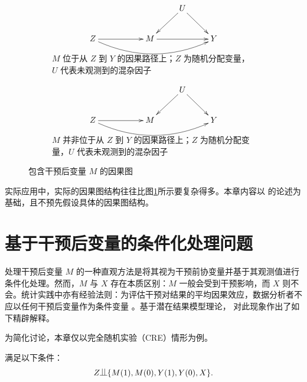  


\begin{figure}[h]
\centering
\begin{subfigure}[]{\textwidth}
                \centering
$$
\begin{xy}
\xymatrix{
&& & U \ar[dl]   \ar[dr] \\
Z \ar[rr] \ar@/_1.5pc/[rrrr] & & M\ar[rr] & & Y\\
}
\end{xy}
$$ 
               \caption{$M$ 位于从 $Z$ 到 $Y$ 的因果路径上；$Z$ 为随机分配变量，$U$ 代表未观测到的混杂因子}
        \end{subfigure}%
        
        \begin{subfigure}[]{\textwidth}
                \centering
$$
\begin{xy}
\xymatrix{
&& & U \ar[dl]   \ar[dr] \\
Z \ar[rr] \ar@/_1.5pc/[rrrr] & & M  & & Y\\
}
\end{xy}
$$
                \caption{$M$ 并非位于从 $Z$ 到 $Y$ 的因果路径上；$Z$ 为随机分配变量，$U$ 代表未观测到的混杂因子}
        \end{subfigure}%
        
\caption{包含干预后变量 $M$ 的因果图}\label{fig::intermediate-diagram}
\end{figure}


实际应用中，实际的因果图结构往往比图\ref{fig::intermediate-diagram}所示要复杂得多。本章内容以 \citet{frangakis2002principal} 的论述为基础，且不预先假设具体的因果图结构。





\section{基于干预后变量的条件化处理问题}

处理干预后变量 $M$ 的一种直观方法是将其视为干预前协变量并基于其观测值进行条件化处理。然而，$M$ 与 $X$ 存在本质区别：$M$ 一般会受到干预影响，而 $X$ 则不会。统计实践中亦有经验法则：为评估干预对结果的平均因果效应，数据分析者不应以任何干预后变量作为条件变量 \citep{cochran1957analysis, rosenbaum1984consquences}。基于潜在结果模型理论，\citet{frangakis2002principal} 对此现象作出了如下精辟解释。 

为简化讨论，本章仅以完全随机实验（CRE）情形为例。

\begin{assumption}
[完全随机实验条件下含中间变量]
\label{assume::complete-randomization-withM}
满足以下条件：
$$
Z \ind  \{ M(1), M(0), Y(1), Y(0), X \} . 
$$
\end{assumption}

